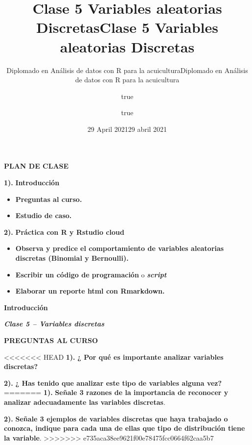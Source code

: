 \documentclass[ignorenonframetext,]{beamer}
\title{Clase 5 Variables aleatorias Discretas}
\subtitle{Diplomado en Análisis de datos con R para la acuicultura}
\author{true}
\date{29 April 2021}
\title{Clase 5 Variables aleatorias Discretas}
\subtitle{Diplomado en Análisis de datos con R para la acuicultura}
\author{true}
\date{29 abril 2021}
\begin{document}
\frame{\titlepage}

\begin{frame}{}
\protect\hypertarget{section}{}

\textbf{PLAN DE CLASE}

\textbf{1).} \textbf{Introducción}

\begin{itemize}
\item
  \textbf{Preguntas al curso.}
\item
  \textbf{Estudio de caso.}
\end{itemize}

\textbf{2).} \textbf{Práctica con R y Rstudio cloud}

\begin{itemize}
\item
  \textbf{Observa y predice el comportamiento de variables aleatorias
  discretas (Binomial y Bernoulli).}
\item
  \textbf{Escribir un código de programación} o \textbf{\emph{script}}
\item
  \textbf{Elaborar un reporte html con Rmarkdown.}
\end{itemize}

\end{frame}

\begin{frame}{}
\protect\hypertarget{section-1}{}

\textbf{Introducción}

\textbf{\emph{Clase 5 -- Variables discretas}}

\end{frame}

\begin{frame}{}
\protect\hypertarget{section-2}{}

\textbf{PREGUNTAS AL CURSO}

<<<<<<< HEAD
\textbf{1).} \textbf{¿ Por qué es importante analizar variables
discretas?}

\textbf{2).} \textbf{¿ Has tenido que analizar este tipo de variables
alguna vez?}
=======
\textbf{1).} \textbf{Señale 3 razones de la importancia de reconocer y
analizar adecuadamente las variables discretas}.

\textbf{2).} \textbf{Señale 3 ejemplos de variables discretas que haya
trabajado o conozca, indique para cada una de ellas que tipo de
distribución tiene la variable}.
>>>>>>> e735aca38ee9621f00e78475fcc0664f62caa5b7

\end{frame}
\end{document}
